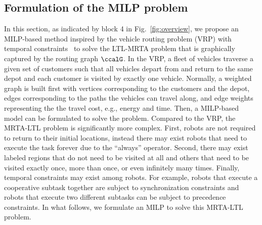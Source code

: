 \documentclass[Afour,sageh,times]{sagej}
\newcommand{\clause}[1]{\mathsf{cls}(#1)}
\newcommand{\vertex}[1]{v_{\textup{#1}}}
\renewcommand{\ap}[3]{\mathcal{\pi}_{{#1},{#2}}^{#3}}
\begin{document}



 \subsection{Formulation of the MILP problem}\label{sec:milp}
 In this section, as indicated by block 4 in Fig.~\ref{fig:overview}, we propose an MILP-based method inspired by the vehicle routing problem (VRP) with temporal constraints~\cite{bredstrom2008combined} to solve the LTL-MRTA problem that is graphically captured by the routing graph $\ccalG$. In the VRP, a fleet of vehicles traverse a given set of customers such that all vehicles depart from and return to the same depot and each customer is visited by exactly one vehicle. Normally, a weighted graph is built first with vertices corresponding to the customers and the depot, edges corresponding to the paths the vehicles can travel along, and edge weights representing the the travel cost, e.g., energy and time. Then,  a MILP-based model can be formulated to solve the problem. Compared to the VRP, the MRTA-LTL problem is significantly more complex. First, robots are not required  to return to their initial locations, instead there may exist robots that need to execute the task forever due to the  ``always'' operator. Second, there may exist  labeled regions that do not need to be  visited at all and others that need to be visited exactly once,  more than once, or even infinitely  many times. Finally, temporal constraints may exist  among robots. For example, robots that execute a cooperative subtask together are subject to synchronization constraints and robots that execute two different subtasks can be subject to precedence constraints. In what follows, we formulate an MILP to solve this MRTA-LTL problem.
\end{document}
